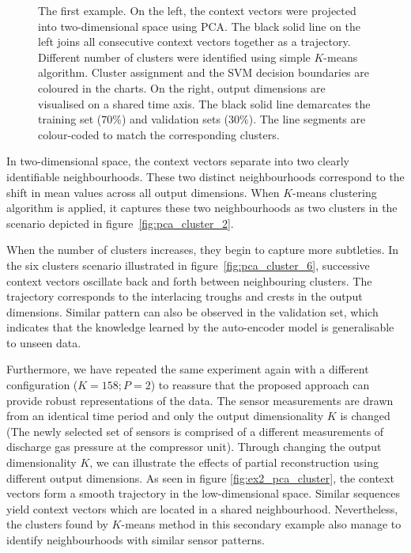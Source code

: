\documentclass[runningheads]{llncs}
\begin{document}
\begin{figure}[H]
	\caption{The first example. On the left, the context vectors were projected into two-dimensional space using PCA. The black solid line on the left joins all consecutive context vectors together as a trajectory. Different number of clusters were identified using simple \(K\)-means algorithm. Cluster assignment and the SVM decision boundaries are coloured in the charts. On the right, output dimensions are visualised on a shared time axis. The black solid line demarcates the training set (\(70\%\)) and validation sets (\(30\%\)). The line segments are colour-coded to match the corresponding clusters.}
	\label{fig:pca_cluster}
\end{figure}

In two-dimensional space, the context vectors separate into two clearly identifiable neighbourhoods. These two distinct neighbourhoods correspond to the shift in mean values across all output dimensions. When \(K\)-means clustering algorithm is applied, it captures these two neighbourhoods as two clusters in the scenario depicted in figure~\ref{fig:pca_cluster_2}.

When the number of clusters increases, they begin to capture more subtleties. In the six clusters scenario illustrated in figure~\ref{fig:pca_cluster_6}, successive context vectors oscillate back and forth between neighbouring clusters. The trajectory corresponds to the interlacing troughs and crests in the output dimensions. Similar pattern can also be observed in the validation set, which indicates that the knowledge learned by the auto-encoder model is generalisable to unseen data.

Furthermore, we have repeated the same experiment again with a different configuration (\(K=158; P=2\)) to reassure that the proposed approach can provide robust representations of the data. The sensor measurements are drawn from an identical time period and only the output dimensionality \(K\) is changed (The newly selected set of sensors is comprised of a different measurements of discharge gas pressure at the compressor unit). Through changing the output dimensionality \(K\), we can illustrate the effects of partial reconstruction using different output dimensions. As seen in figure \ref{fig:ex2_pca_cluster}, the context vectors form a smooth trajectory in the low-dimensional space. Similar sequences yield context vectors which are located in a shared neighbourhood. Nevertheless, the clusters found by \(K\)-means method in this secondary example also manage to identify neighbourhoods with similar sensor patterns.
\end{document}
